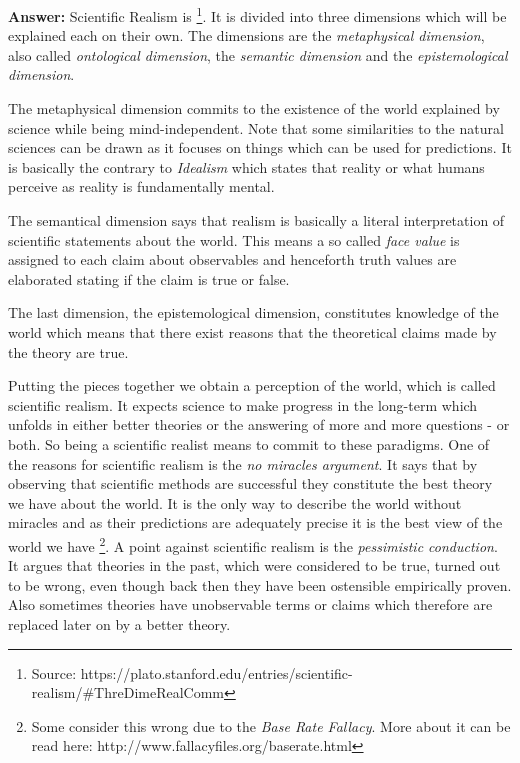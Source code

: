 \documentclass[11pt]{scrartcl}
\begin{document}
\bigbreak

\textbf{Answer:} Scientific Realism is  \footnote{Source: https://plato.stanford.edu/entries/scientific-realism/\#ThreDimeRealComm}. It is divided into three dimensions which will be explained each on their own. The dimensions are the \textit{metaphysical dimension}, also called \textit{ontological dimension}, the \textit{semantic dimension} and the \textit{epistemological dimension}.

The metaphysical dimension commits to the existence of the world explained by science while being mind-independent. Note that some similarities to the natural sciences can be drawn as it focuses on things which can be used for predictions. It is basically the contrary to \textit{Idealism} which states that reality or what humans perceive as reality is fundamentally mental.

The semantical dimension says that realism is basically a literal interpretation of scientific statements about the world. This means a so called \textit{face value} is assigned to each claim about observables and henceforth truth values are elaborated stating if the claim is true or false.

The last dimension, the epistemological dimension, constitutes knowledge of the world which means that there exist reasons that the theoretical claims made by the theory are true.

Putting the pieces together we obtain a perception of the world, which is called scientific realism. It expects science to make progress in the long-term which unfolds in either better theories or the answering of more and more questions - or both. So being a scientific realist means to commit to these paradigms. One of the reasons for scientific realism is the \textit{no miracles argument}. It says that by observing that scientific methods are successful they constitute the best theory we have about the world. It is the only way to describe the world without miracles and as their predictions are adequately precise it is the best view of the world we have \footnote{Some consider this wrong due to the \textit{Base Rate Fallacy}. More about it can be read here: http://www.fallacyfiles.org/baserate.html}. A point against scientific realism is the \textit{pessimistic conduction}. It argues that theories in the past, which were considered to be true, turned out to be wrong, even though back then they have been ostensible empirically proven. Also sometimes theories have unobservable terms or claims which therefore are replaced later on by a better theory.
\end{document}
